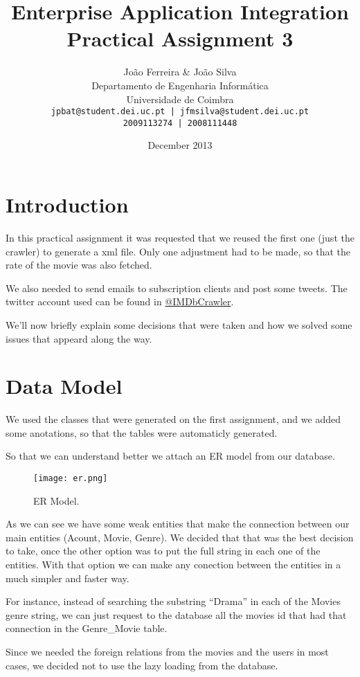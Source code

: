 \documentclass[12pt]{article}
\title{Enterprise Application Integration \\ Practical Assignment 3}
\author{
		João Ferreira \& João Silva\\
		Departamento de Engenharia Informática\\
		Universidade de Coimbra\\
		\texttt{jpbat@student.dei.uc.pt | jfmsilva@student.dei.uc.pt}\\
		\texttt{2009113274 | 2008111448}
		}
\date{December 2013}
\begin{document}
\maketitle
\clearpage

\tableofcontents

\setlength{\parindent}{1cm}
\setlength{\parskip}{0.3cm}

\clearpage
\section{Introduction}
\indent \indent In this practical assignment it was requested that we reused the first one (just the crawler) to generate a xml file. Only one adjustment had to be made, so that the rate of the movie was also fetched.

We also needed to send emails to subscription clients and post some tweets. The twitter account used can be found in \href{https://twitter.com/IMDbCrawler}{@IMDbCrawler}.

We'll now briefly explain some decisions that were taken and how we solved some issues that appeard along the way.
\clearpage

\section{Data Model}
\indent \indent We used the classes that were generated on the first assignment, and we added some anotations, so that the tables were automaticly generated.

So that we can understand better we attach an ER model from our database.

\begin{figure}[h!]
	\centering
	\texttt{[image: er.png]}
	\caption{ER Model.}
\end{figure}

As we can see we have some weak entities that make the connection between our main entities (Acount, Movie, Genre). We decided that that was the best decision to take, once the other option was to put the full string in each one of the entities. With that option we can make any conection between the entities in a much simpler and faster way.

For instance, instead of searching the substring ``Drama'' in each of the Movies genre string, we can just request to the database all the movies id that had that connection in the Genre\_Movie table.

Since we needed the foreign relations from the movies and the users in most cases, we decided not to use the lazy loading from the database.
\clearpage
\end{document}

